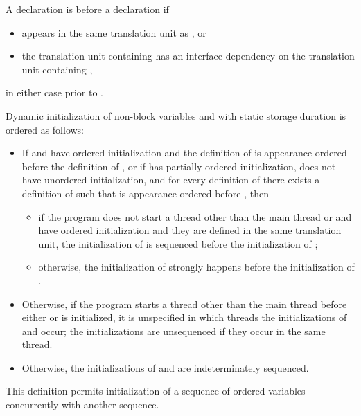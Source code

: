 \pnum
A declaration  is
 before a declaration  if
\begin{itemize}
\item {} appears in the same translation unit as , or
\item the translation unit containing 
has an interface dependency
on the translation unit containing ,
\end{itemize}
in either case prior to .

\pnum
Dynamic initialization of non-block variables  and 
with static storage duration is ordered as follows:
\begin{itemize}
\item
If  and  have ordered initialization and
the definition of 
is appearance-ordered before the definition of , or
if  has partially-ordered initialization,
 does not have unordered initialization, and
for every definition  of 
there exists a definition  of 
such that  is appearance-ordered before , then
\begin{itemize}
\item
if the program does not start a thread
other than the main thread
or  and  have ordered initialization and
they are defined in the same translation unit,
the initialization of 
is sequenced before
the initialization of ;
\item
otherwise,
the initialization of 
strongly happens before
the initialization of .
\end{itemize}

\item
Otherwise, if the program starts a thread
other than the main thread
before either  or  is initialized,
it is unspecified in which threads
the initializations of  and  occur;
the initializations are unsequenced if they occur in the same thread.

\item
Otherwise, the initializations of  and  are indeterminately sequenced.
\end{itemize}
\begin{note}
This definition permits initialization of a sequence of
ordered variables concurrently with another sequence.
\end{note}

